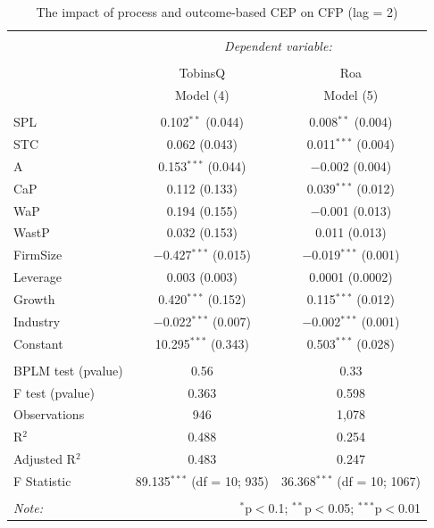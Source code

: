 \documentclass[12pt,]{article}
\begin{document}
\newpage

\begin{table}[!] \centering 
  \caption{The impact of process and outcome-based CEP on CFP (lag = 2)} 
  \label{Lag2} 
\begin{tabular}{@{\extracolsep{5pt}}lcc} 
\\[-1.8ex]\hline 
\hline \\[-1.8ex] 
 & \multicolumn{2}{c}{\textit{Dependent variable:}} \\ 
\cline{2-3} 
\\[-1.8ex] & TobinsQ & Roa \\ 
 & Model (4) & Model (5) \\ 
\hline \\[-1.8ex] 
 SPL & 0.102$^{**}$ (0.044) & 0.008$^{**}$ (0.004) \\ 
  STC & 0.062 (0.043) & 0.011$^{***}$ (0.004) \\ 
  A & 0.153$^{***}$ (0.044) & $-$0.002 (0.004) \\ 
  CaP & 0.112 (0.133) & 0.039$^{***}$ (0.012) \\ 
  WaP & 0.194 (0.155) & $-$0.001 (0.013) \\ 
  WastP & 0.032 (0.153) & 0.011 (0.013) \\ 
  FirmSize & $-$0.427$^{***}$ (0.015) & $-$0.019$^{***}$ (0.001) \\ 
  Leverage & 0.003 (0.003) & 0.0001 (0.0002) \\ 
  Growth & 0.420$^{***}$ (0.152) & 0.115$^{***}$ (0.012) \\ 
  Industry & $-$0.022$^{***}$ (0.007) & $-$0.002$^{***}$ (0.001) \\ 
  Constant & 10.295$^{***}$ (0.343) & 0.503$^{***}$ (0.028) \\ 
 \hline \\[-1.8ex] 
BPLM test (pvalue) & 0.56 & 0.33 \\ 
F test (pvalue) & 0.363 & 0.598 \\ 
Observations & 946 & 1,078 \\ 
R$^{2}$ & 0.488 & 0.254 \\ 
Adjusted R$^{2}$ & 0.483 & 0.247 \\ 
F Statistic & 89.135$^{***}$ (df = 10; 935) & 36.368$^{***}$ (df = 10; 1067) \\ 
\hline 
\hline \\[-1.8ex] 
\textit{Note:}  & \multicolumn{2}{r}{$^{*}$p$<$0.1; $^{**}$p$<$0.05; $^{***}$p$<$0.01} \\ 
\end{tabular} 
\end{table}
\end{document}
